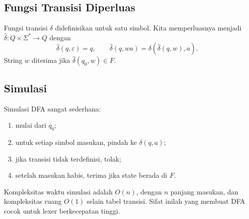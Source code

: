 \subsection{Fungsi Transisi Diperluas}

Fungsi transisi \(\delta\) didefinisikan untuk satu simbol. Kita
memperluasnya menjadi \(\hat{\delta} : Q \times \Sigma^{*} \to Q\)
dengan
\[
\hat{\delta}(q, \varepsilon) = q, \qquad
\hat{\delta}(q, wa) = \delta(\hat{\delta}(q,w), a).
\]
String \(w\) diterima jika \(\hat{\delta}(q_0, w) \in F\).

\subsection{Simulasi}

Simulasi DFA sangat sederhana:
\begin{enumerate}[label=\arabic*.,leftmargin=*]
  \item mulai dari \(q_0\);
  \item untuk setiap simbol masukan, pindah ke
        \(\delta(q, a)\);
  \item jika transisi tidak terdefinisi, tolak;
  \item setelah masukan habis, terima jika state berada di \(F\).
\end{enumerate}

Kompleksitas waktu simulasi adalah \(O(n)\), dengan \(n\) panjang
masukan, dan kompleksitas ruang \(O(1)\) selain tabel transisi.
Sifat inilah yang membuat DFA cocok untuk lexer berkecepatan tinggi.
